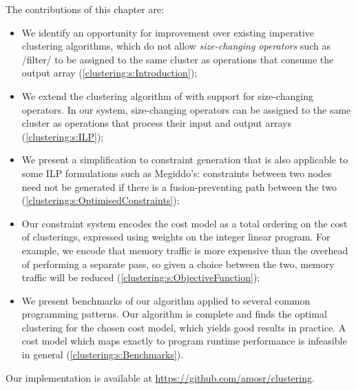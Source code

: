 The contributions of this chapter are:
\begin{itemize}
\item
We identify an opportunity for improvement over existing imperative clustering algorithms, which do not allow \emph{size-changing operators} such as \Hs/filter/ to be assigned to the same cluster as operations that consume the output array (\cref{clustering:s:Introduction});

\item   
We extend the clustering algorithm of \citet{megiddo1998optimal} with support for size-changing operators.
In our system, size-changing operators can be assigned to the same cluster as operations that process their input and output arrays (\cref{clustering:s:ILP});

\item
We present a simplification to constraint generation that is also applicable to some ILP formulations such as Megiddo's:
constraints between two nodes need not be generated if there is a fusion-preventing path between the two (\cref{clustering:s:OptimisedConstraints});

\item
Our constraint system encodes the cost model as a total ordering on the cost of clusterings, expressed using weights on the integer linear program.
For example, we encode that memory traffic is more expensive than the overhead of performing a separate pass, so given a choice between the two, memory traffic will be reduced (\cref{clustering:s:ObjectiveFunction});

\item
We present benchmarks of our algorithm applied to several common programming patterns.
Our algorithm is complete and finds the optimal clustering for the chosen cost model, which yields good results in practice.
A cost model which maps exactly to program runtime performance is infeasible in general (\cref{clustering:s:Benchmarks}).
\end{itemize}

Our implementation is available at \url{https://github.com/amosr/clustering}.



